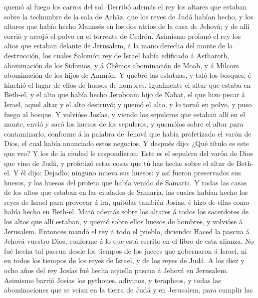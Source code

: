 quemó al fuego los carros del sol.  Derribó además el rey
los altares que estaban sobre la techumbre de la sala de Achâz, que los
reyes de Judá habían hecho, y los altares que había hecho Manasés en los
dos atrios de la casa de Jehová; y de allí corrió y arrojó el polvo en
el torrente de Cedrón.  Asimismo profanó el rey los altos
que estaban delante de Jerusalem, á la mano derecha del monte de la
destrucción, los cuales Salomón rey de Israel había edificado á
Astharoth, abominación de los Sidonios, y á Chêmos abominación de Moab,
y á Milcom abominación de los hijos de Ammón.  Y quebró
las estatuas, y taló los bosques, é hinchió el lugar de ellos de huesos
de hombres.  Igualmente el altar que estaba en Beth-el, y
el alto que había hecho Jeroboam hijo de Nabat, el que hizo pecar á
Israel, aquel altar y el alto destruyó; y quemó el alto, y lo tornó en
polvo, y puso fuego al bosque.  Y volvióse Josías, y
viendo los sepulcros que estaban allí en el monte, envió y sacó los
huesos de los sepulcros, y quemólos sobre el altar para contaminarlo,
conforme á la palabra de Jehová que había profetizado el varón de Dios,
el cual había anunciado estos negocios.  Y después dijo:
¿Qué título es este que veo? Y los de la ciudad le respondieron: Este es
el sepulcro del varón de Dios que vino de Judá, y profetizó estas cosas
que tú has hecho sobre el altar de Beth-el.  Y él dijo:
Dejadlo; ninguno mueva sus huesos: y así fueron preservados sus huesos,
y los huesos del profeta que había venido de Samaria.  Y
todas las casas de los altos que estaban en las ciudades de Samaria, las
cuales habían hecho los reyes de Israel para provocar á ira, quitólas
también Josías, é hizo de ellas como había hecho en Beth-el.
 Mató además sobre los altares á todos los sacerdotes de
los altos que allí estaban, y quemó sobre ellos huesos de hombres, y
volvióse á Jerusalem.  Entonces mandó el rey á todo el
pueblo, diciendo: Haced la pascua á Jehová vuestro Dios, conforme á lo
que está escrito en el libro de esta alianza.  No fué
hecha tal pascua desde los tiempos de los jueces que gobernaron á
Israel, ni en todos los tiempos de los reyes de Israel, y de los reyes
de Judá.  A los diez y ocho años del rey Josías fué hecha
aquella pascua á Jehová en Jerusalem.  Asimismo barrió
Josías los pythones, adivinos, y terapheos, y todas las abominaciones
que se veían en la tierra de Judá y en Jerusalem, para cumplir las
